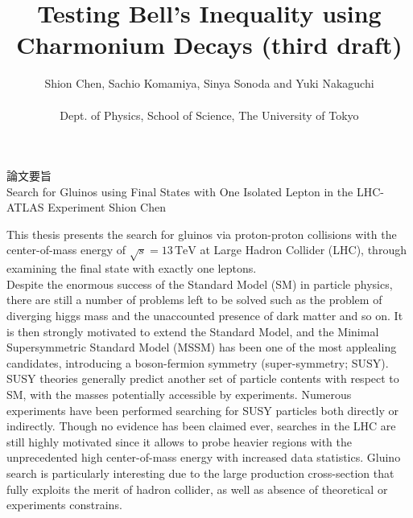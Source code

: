 \documentclass {article}
\title{Testing Bell's Inequality using Charmonium Decays (third draft)}
\author{Shion Chen, Sachio Komamiya, Sinya Sonoda and Yuki Nakaguchi\\ \\
Dept. of Physics, School of Science, The University of Tokyo}
\newcommand{\tev}{\, \mathrm{TeV}}
\newcommand{\gev}{\, \mathrm{GeV}}
\begin{document}
\setlength{\abovedisplayskip}{4pt} %
\setlength{\belowdisplayskip}{8pt}%

\maketitle



 

\begin{center}
論文要旨 \\
Search for Gluinos using Final States with One Isolated Lepton in the LHC- ATLAS Experiment \mbox{\phantom{MMMMMM}} Shion Chen
\end{center}

This thesis presents the search for gluinos via proton-proton collisions with the center-of-mass energy of $\sqrt{s}=13\tev$ at Large Hadron Collider (LHC), through examining the final state with exactly one leptons.  \\

Despite the enormous success of the Standard Model (SM) in particle physics, there are still a number of problems left to be solved such as the problem of diverging higgs mass and the unaccounted presence of dark matter and so on.
It is then strongly motivated to extend the Standard Model, and the Minimal Supersymmetric Standard Model (MSSM) has been one of the most applealing candidates, introducing a boson-fermion symmetry (super-symmetry; SUSY). 
SUSY theories generally predict another set of particle contents with respect to SM, with the masses potentially accessible by experiments.
Numerous experiments have been performed searching for SUSY particles both directly or indirectly.
Though no evidence has been claimed ever, searches in the LHC are still highly motivated since it allows to probe heavier regions with the unprecedented high center-of-mass energy with increased data statistics.
Gluino search is particularly interesting due to the large production cross-section that fully exploits the merit of hadron collider, as well as absence of theoretical or experiments constrains. \\
\end{document}
